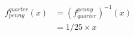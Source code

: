 \vbox{
  \begin{align*}
    f_{penny}^{quarter}(x) & = {(f_{quarter}^{penny})}^{-1}(x) \\
                           & =  1/25 \times x
  \end{align*}
}
